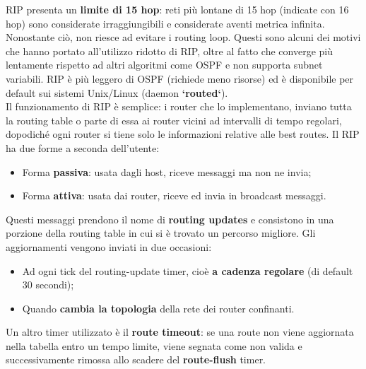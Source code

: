         RIP presenta un \textbf{limite di 15 hop}: reti più lontane di 15 hop (indicate con 16 hop) sono
        considerate irraggiungibili e considerate aventi metrica infinita. Nonostante ciò, non riesce ad
        evitare i routing loop. Questi sono alcuni dei motivi che hanno portato all’utilizzo ridotto di RIP,
        oltre al fatto che converge più lentamente rispetto ad altri algoritmi come OSPF e non supporta
        subnet variabili. RIP è più leggero di OSPF (richiede meno risorse) ed è disponibile per default
        sui sistemi Unix/Linux (daemon \textbf{`routed`}).\\
        
        Il funzionamento di RIP è semplice: i router che lo implementano, inviano tutta la routing table
        o parte di essa ai router vicini ad intervalli di tempo regolari, dopodiché ogni router si tiene
        solo le informazioni relative alle best routes. Il RIP ha due forme a seconda dell’utente:\\
        
            \begin{itemize}
                \item Forma \textbf{passiva}: usata dagli host, riceve messaggi ma non ne invia;
                \item Forma \textbf{attiva}: usata dai router, riceve ed invia in broadcast messaggi.
            \end{itemize}
        
        Questi messaggi prendono il nome di \textbf{routing updates} e consistono in una porzione della
        routing table in cui si è trovato un percorso migliore. Gli aggiornamenti vengono inviati in due
        occasioni:
        
            \begin{itemize}
                \item Ad ogni tick del routing-update timer, cioè \textbf{a cadenza regolare} (di default 30 secondi);
                \item Quando \textbf{cambia la topologia} della rete dei router confinanti.
            \end{itemize}
            
        Un altro timer utilizzato è il \textbf{route timeout}: se una route non viene aggiornata nella tabella
        entro un tempo limite, viene segnata come non valida e successivamente rimossa allo scadere
        del \textbf{route-flush} timer.\\

